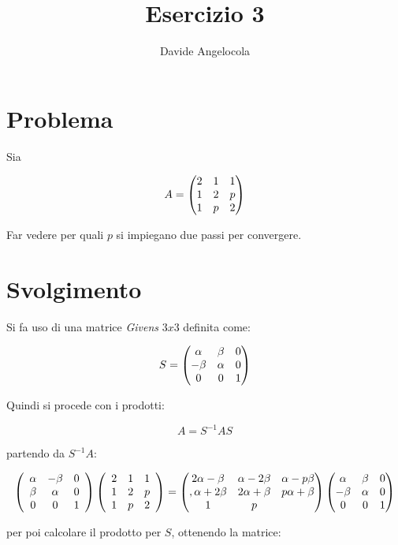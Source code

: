 \documentclass{article}
\title{Esercizio 3}
\author{Davide Angelocola}
\begin{document}
\maketitle

\section{Problema}

Sia 

$$ A = \begin{pmatrix} 
  2 & 1 & 1 \cr
  1 & 2 & p \cr
  1 & p & 2 \cr
\end{pmatrix}$$

Far vedere per quali $p$ si impiegano due passi per convergere.

\section{Svolgimento}

Si fa uso di una matrice \textit{Givens} $3x3$ definita come:

$$S = \begin{pmatrix}
 \alpha & \beta & 0  \cr 
 -\beta & \alpha & 0 \cr  
 0 & 0 & 1           \cr
\end{pmatrix}$$

Quindi si procede con i prodotti:

$$A = S^{-1}AS$$

partendo da $S^{-1}A$:

$$\left(
\begin{array}{ccc}
 \alpha  & -\beta  & 0 \\
 \beta  & \alpha  & 0 \\
 0 & 0 & 1
\end{array}
\right)\left(
\begin{array}{ccc}
 2 & 1 & 1 \\
 1 & 2 & p \\
 1 & p & 2
\end{array}
\right) = \begin{pmatrix}2\alpha -\beta & \alpha -2 \beta & \alpha -p \beta \cr, \alpha +2 \beta & 2 \alpha +\beta & p \alpha +\beta \cr 1 & p \end{pmatrix}\begin{pmatrix}
 \alpha & \beta & 0  \cr 
 -\beta & \alpha & 0 \cr  
 0 & 0 & 1           \cr
\end{pmatrix}$$

per poi calcolare il prodotto per $S$, ottenendo la matrice:
\end{document}
